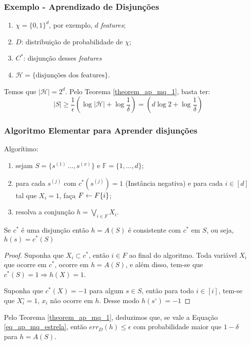 \subsubsection{Exemplo - Aprendizado de Disjunções}
\begin{enumerate}
    \item $\chi = \{0,1\}^d$, por exemplo, $d$ \emph{features};
    \item $D$: distribuição de probabilidade de $\chi$;
    \item $C^*$: disjunção desses \emph{features}
    \item $\mathcal{H} = \{\text{disjunções dos features}\}$.
\end{enumerate}{}

Temos que $|\mathcal{H}| = 2^d$. Pelo Teorema \ref{theorem_ap_mq_1}, basta ter:
\begin{equation}
\label{eq_ap_mq_estrela}
    |S| \geq \frac{1}{\epsilon}\left(\log{|\mathcal{H}|} + \log{\frac{1}{\delta}}\right) = \left(d\log{2} + \log{\frac{1}{\delta}}\right)
\end{equation}

\subsubsection*{Algoritmo Elementar para Aprender disjunções}

Algorítimo:
\begin{enumerate}
    \item sejam $S = \{s^{(1)}\, \dots, s^{(x)}\}$ e $\mathbb{F} = \{1, \dots, d\}$;
    \item para cada $s^{(j)}$ com $c^*(s^{(j)}) = 1$ (Instância negativa) e para cada $i \in [d]$ tal que $X_i = 1$, faça $F \leftarrow F \\ \{i\}$;
    \item resolva a conjunção $h = \bigvee_{i \in F}X_i$.
\end{enumerate}

\begin{lemma*}
Se $c^*$ é uma disjunção então $h = A(S)$ é consistente com $c^*$ em $S$, ou seja, $h(s) = c^*(S)$
\end{lemma*}

\begin{proof}
Suponha que $X_i \subset c^*$, então $i \in F$ ao final do algoritmo.
Toda variável $X_i$ que ocorre em $c^*$, ocorre em $h = A(S)$, e além disso, tem-se que $c^*(S) = 1 \Rightarrow h(X) = 1$.

Suponha que $c^*(X) = -1$ para algum $s \in S$, então para todo $i \in [i]$, tem-se que $X_{i}^{\circ} = 1$, $x_i$ não ocorre em $h$. Desse modo $h(s^\circ) = -1$
\end{proof}

Pelo Teorema \ref{theorem_ap_mq_1}, deduzimos que, se vale a Equação \ref{eq_ap_mq_estrela}, então $err_D(h) \leq \epsilon$ com probabilidade maior que $1-\delta$ para $h=A(S)$.
